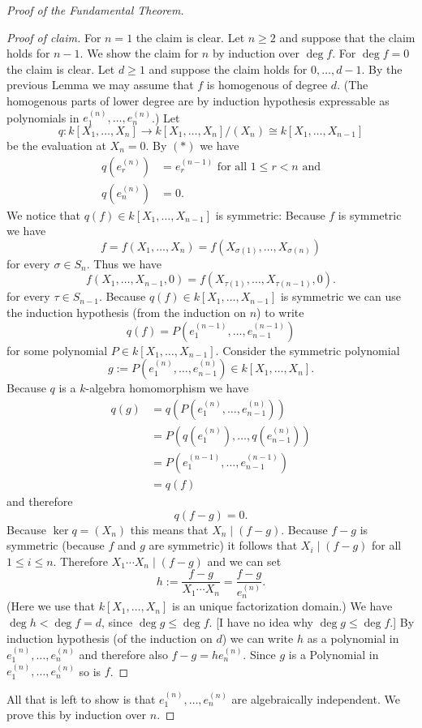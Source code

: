 \begin{proof}[Proof of the Fundamental Theorem]
\begin{proof}[Proof of claim]
  For $n = 1$ the claim is clear. Let $n \geq 2$ and suppose that the claim holds for $n-1$. We show the claim for $n$ by induction over $\deg f$. For $\deg f = 0$ the claim is clear. Let $d \geq 1$ and suppose the claim holds for $0, \ldots, d-1$. By the previous Lemma we may assume that $f$ is homogenous of degree $d$. (The homogenous parts of lower degree are by induction hypothesis expressable as polynomials in $e^{(n)}_1, \ldots, e^{(n)}_n$.) Let
  \[
   q : k[X_1, \ldots, X_n] \to k[X_1, \ldots, X_n]/(X_n) \cong k[X_1, \ldots, X_{n-1}]
  \]
  be the evaluation at $X_n = 0$. By $(\ast)$ we have
  \begin{align*}
   q\left( e^{(n)}_r \right) &= e^{(n-1)}_r \text{ for all } 1 \leq r < n \text{ and}\\
   q\left( e^{(n)}_n \right) &= 0.
  \end{align*}
  We notice that $q(f) \in k[X_1, \ldots, X_{n-1}]$ is symmetric: Because $f$ is symmetric we have
  \[
   f = f(X_1, \ldots, X_n) = f(X_{\sigma(1)}, \ldots, X_{\sigma(n)})
  \]
  for every $\sigma \in S_n$. Thus we have
  \[
   f(X_1, \ldots, X_{n-1}, 0) = f(X_{\tau(1)}, \ldots, X_{\tau(n-1)}, 0).
  \]
  for every $\tau \in S_{n-1}$. Because $q(f) \in k[X_1, \ldots, X_{n-1}]$ is symmetric we can use the induction hypothesis (from the induction on $n$) to write
  \[
   q(f) = P\left(e^{(n-1)}_1, \ldots, e^{(n-1)}_{n-1}\right)
  \]
  for some polynomial $P \in k[X_1, \ldots, X_{n-1}]$. Consider the symmetric polynomial
  \[
   g := P\left(e^{(n)}_1, \ldots, e^{(n)}_{n-1}\right) \in k[X_1, \ldots, X_n].
  \]
  Because $q$ is a $k$-algebra homomorphism we have
  \begin{align*}
   q(g)
   &= q\left( P\left(e^{(n)}_1, \ldots, e^{(n)}_{n-1}\right) \right) \\
   &= P\left( q\left(e^{(n)}_1\right), \ldots, q\left(e^{(n)}_{n-1}\right) \right) \\
   &= P\left( e^{(n-1)}_1, \ldots, e^{(n-1)}_{n-1} \right) \\
   &= q(f)
  \end{align*}
  and therefore
  \[
   q(f-g) = 0.
  \]
  Because $\ker q = (X_n)$ this means that $X_n \mid (f-g)$. Because $f-g$ is symmetric (because $f$ and $g$ are symmetric) it follows that $X_i \mid (f-g)$ for all $1 \leq i \leq n$. Therefore $X_1 \cdots X_n \mid (f-g)$ and we can set
  \[
   h := \frac{f-g}{X_1 \cdots X_n} = \frac{f-g}{e^{(n)}_n}.
  \]
  (Here we use that $k[X_1, \ldots, X_n]$ is an unique factorization domain.) We have $\deg h < \deg f = d$, since $\deg g \leq \deg f$. [I have no idea why $\deg g \leq \deg f$.] By induction hypothesis (of the induction on $d$) we can write $h$ as a polynomial in $e^{(n)}_1, \ldots, e^{(n)}_n$ and therefore also $f-g = h e^{(n)}_n$. Since $g$ is a Polynomial in $e^{(n)}_1, \ldots, e^{(n)}_n$ so is $f$.
 \end{proof}
  All that is left to show is that $e^{(n)}_1, \ldots, e^{(n)}_n$ are algebraically independent. We prove this by induction over $n$.
  

\end{proof}
